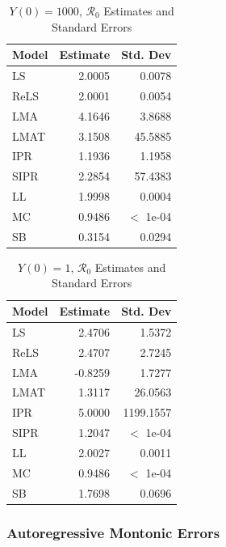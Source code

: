 \documentclass[12pt]{article}
\newcommand{\rr}{\ensuremath{\mathcal{R}_0}}
\begin{document}
\begin{table}[H]
	
	\centering
	\begin{tabular}[t]{l|r|r}
		\hline
		Model & Estimate & Std. Dev\\
		\hline
		LS & 2.0005 & 0.0078\\
		\hline
		ReLS & 2.0001 & 0.0054\\
		\hline
		LMA & 4.1646 & 3.8688\\
		\hline
		LMAT & 3.1508 & 45.5885\\
		\hline
		IPR & 1.1936 & 1.1958\\
		\hline
		SIPR & 2.2854 & 57.4383\\
		\hline
		LL & 1.9998 & 0.0004\\
		\hline
		MC & 0.9486 & $<$ 1e-04\\
		\hline
		SB & 0.3154 & 0.0294\\
		\hline
	\end{tabular}
	\caption{$Y(0) = 1000$, $\rr$ Estimates and Standard Errors}
\end{table}

\begin{table}[H]
	
	\centering
	\begin{tabular}[t]{l|r|r}
		\hline
		Model & Estimate & Std. Dev\\
		\hline
		LS & 2.4706 & 1.5372\\
		\hline
		ReLS & 2.4707 & 2.7245\\
		\hline
		LMA & -0.8259 & 1.7277\\
		\hline
		LMAT & 1.3117 & 26.0563\\
		\hline
		IPR & 5.0000 & 1199.1557\\
		\hline
		SIPR & 1.2047 & $<$ 1e-04\\
		\hline
		LL & 2.0027 & 0.0011\\
		\hline
		MC & 0.9486 & $<$ 1e-04\\
		\hline
		SB & 1.7698 & 0.0696\\
		\hline
	\end{tabular}
	\caption{$Y(0) = 1$, $\rr$ Estimates and Standard Errors}
\end{table}

\subsubsection{Autoregressive Montonic Errors}
\end{document}
